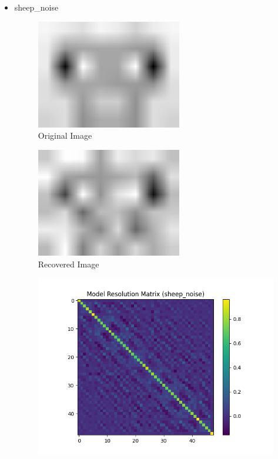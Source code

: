 \documentclass{article}
\begin{document}
\begin{itemize}
        \item sheep\_noise
    \begin{figure}[h]
        \centering
        \includegraphics[width=0.6\textwidth]{images/greyscale/sheep.png}
        \caption{Original Image}
    \end{figure}
    \begin{figure}[h]
        \centering
        \includegraphics[width=0.6\textwidth]{images/outputs/noise/sheep_noise.png}
        \caption{Recovered Image}
    \end{figure}
    \begin{figure}[h]
        \centering
        \includegraphics[width=1\textwidth]{images/outputs/modelres/sheep_noise.png}

\end{figure}
\end{itemize}
\end{document}

